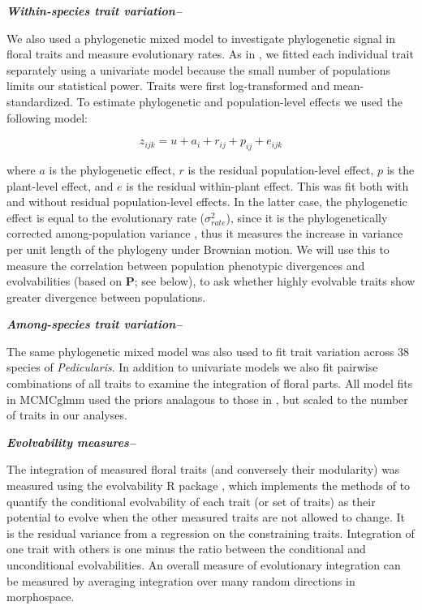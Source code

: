 \documentclass[12pt,letterpaper]{article}
\def\P{\emph{Pedicularis}}
\def\PM{{\bf P}}
\renewcommand{\subsection}[1]{%
\bigskip
{\noindent \normalfont \bf \emph{#1}}
}
\begin{document}
\subsection{Within-species trait variation--}
We also used a phylogenetic mixed model \citep{lynch,hadfield} to investigate phylogenetic signal in floral traits and measure evolutionary rates. As in \citep{bolstad_genetic_2014}, we fitted each individual trait separately using a univariate model because the small number of populations limits our statistical power. Traits were first log-transformed and mean-standardized. To estimate phylogenetic and population-level effects we used the following model:

\begin{equation}
z_{ijk} = u + a_i + r_{ij} + p_{ij} + e_{ijk}
\end{equation}

\noindent where $a$ is the phylogenetic effect, $r$ is the residual population-level effect, $p$ is the plant-level effect, and $e$ is the residual within-plant effect. This was fit both with and without residual population-level effects. In the latter case, the phylogenetic effect is equal to the evolutionary rate ($\sigma^2_{rate}$), 
since it is the phylogenetically corrected among-population variance \citep{bolstad}, thus it measures
the increase in variance per unit length of the phylogeny under Brownian motion. 
We will use this to measure the correlation between population phenotypic divergences 
and evolvabilities (based on \PM; see below), to ask whether highly evolvable traits 
show greater divergence between populations. 

\subsection{Among-species trait variation--}
The same phylogenetic mixed model was also used to fit trait variation across 38 species of \P. In addition to univariate models we also fit pairwise combinations of all traits to examine the integration of floral parts. All model fits in MCMCglmm used the priors analagous to those in \cite{bolstad}, but scaled to the number of traits in our analyses.

\subsection{Evolvability measures--}
The integration of measured floral traits (and conversely their modularity) was measured using the 
evolvability R package \citep{}, which implements the methods of \citep{hansen&houle} to quantify
the conditional evolvability of each trait (or set of traits) as their potential to evolve 
when the other measured traits are not allowed to change. It is the residual variance from a 
regression on the constraining traits. Integration of one trait with others 
is one minus the ratio between the conditional and unconditional evolvabilities.
An overall measure of evolutionary integration can be measured by averaging 
integration over many random directions in morphospace. 
 
\end{document}
